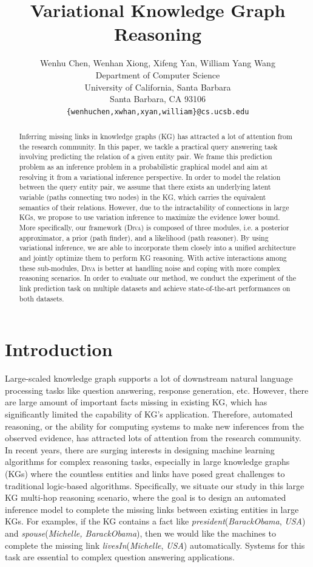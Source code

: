 \documentclass[11pt,a4paper]{article}
\title{Variational Knowledge Graph Reasoning}
\author{Wenhu Chen, Wenhan Xiong, Xifeng Yan, William Yang Wang\\
  Department of Computer Science\\
  University of California, Santa Barbara\\
  Santa Barbara, CA 93106 \\
  {\tt \{wenhuchen,xwhan,xyan,william\}@cs.ucsb.edu} \\}
\date{}
\begin{document}
\maketitle
\begin{abstract}
Inferring missing links in knowledge graphs (KG) has attracted a lot of attention from the research community. In this paper, we tackle a practical query answering task involving predicting the relation of a given entity pair. We frame this prediction problem as an inference problem in a probabilistic graphical model and aim at resolving it from a variational inference perspective. In order to model the relation between the query entity pair, we assume that there exists an underlying latent variable (paths connecting two nodes) in the KG, which carries the equivalent semantics of their relations. However, due to the intractability of connections in large KGs, we propose to use variation inference to maximize the evidence lower bound. More specifically, our framework (\textsc{Diva}) is composed of three modules, i.e. a posterior approximator, a prior (path finder), and a likelihood (path reasoner). By using variational inference, we are able to incorporate them closely into a unified architecture and jointly optimize them to perform KG reasoning. With active interactions among these sub-modules, \textsc{Diva} is better at handling noise and coping with more complex reasoning scenarios. In order to evaluate our method, we conduct the experiment of the link prediction task on multiple datasets and achieve state-of-the-art performances on both datasets.
\end{abstract}

\section{Introduction}
Large-scaled knowledge graph supports a lot of downstream natural language processing tasks like question answering, response generation, etc. However, there are large amount of important facts missing in existing KG, which has significantly limited the capability of KG's application. Therefore, automated reasoning, or the ability for computing systems to make new inferences from the observed evidence, has attracted lots of attention from the research community. In recent years, there are surging interests in designing machine learning algorithms for complex reasoning tasks, especially in large knowledge graphs (KGs) where the countless entities and links have posed great challenges to traditional logic-based algorithms. Specifically, we situate our study in this large KG multi-hop reasoning scenario, where the goal is to design an automated inference model to complete the missing links between existing entities in large KGs. For examples, if the KG contains a fact like \textit{president}(\textit{BarackObama}, \textit{USA}) and \textit{spouse}(\textit{Michelle, BarackObama}), then we would like the machines to complete the missing link \textit{livesIn}(\textit{Michelle}, \textit{USA}) automatically. Systems for this task are essential to complex question answering applications.  
\end{document}
